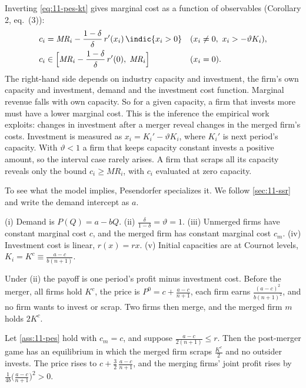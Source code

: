 Inverting \eqref{eq:11-pes-kt} gives marginal cost as a function of observables (Corollary 2, eq.~(3)):
\begin{equation}\label{eq:11-pes-cost}
\begin{aligned}
c_i &= \mathit{MR}_i - \frac{1 - \delta}{\delta}\, r'(x_i)\,\indic\{x_i > 0\} && (x_i \neq 0,\ x_i > -\vartheta K_i),\\
c_i &\in \Big[\mathit{MR}_i - \frac{1 - \delta}{\delta}\, r'(0),\; \mathit{MR}_i\Big] && (x_i = 0).
\end{aligned}
\end{equation}
The right-hand side depends on industry capacity and investment, the firm's own capacity and investment, demand and
the investment cost function. Marginal revenue falls with own capacity. So for a given capacity, a firm that invests
more must have a lower marginal cost. This is the inference the empirical work exploits: changes in investment after a
merger reveal changes in the merged firm's costs. Investment is measured as $x_i = K_i' - \vartheta K_i$, where $K_i'$
is next period's capacity. With $\vartheta < 1$ a firm that keeps capacity constant invests a positive amount, so the
interval case rarely arises. A firm that scraps all its capacity reveals only the bound $c_i \ge \mathit{MR}_i$, with
$c_i$ evaluated at zero capacity.

To see what the model implies, Pesendorfer specializes it. We follow \cref{sec:11-ssr} and write the demand intercept
as $a$.

\begin{assumption}\label{ass:11-pes}
(i) Demand is $P(Q) = a - bQ$. (ii) $\frac{\delta}{1 - \delta} = \vartheta = 1$. (iii) Unmerged firms have constant
marginal cost $c$, and the merged firm has constant marginal cost $c_m$. (iv) Investment cost is linear, $r(x) = rx$.
(v) Initial capacities are at Cournot levels, $K_i = K^c \equiv \frac{a - c}{b(n + 1)}$.
\end{assumption}

Under (ii) the payoff is one period's profit minus investment cost. Before the merger, all firms hold $K^c$, the price
is $P^0 = c + \frac{a - c}{n + 1}$, each firm earns $\frac{(a - c)^2}{b(n + 1)^2}$, and no firm wants to invest or scrap.
Two firms then merge, and the merged firm $m$ holds $2K^c$.

\begin{proposition}\label{prop:11-pes-profit}
Let \cref{ass:11-pes} hold with $c_m = c$, and suppose $\frac{a - c}{2(n + 1)} \le r$. Then the post-merger game has an
equilibrium in which the merged firm scraps $\frac{K^c}{2}$ and no outsider invests. The price rises to $c +
\frac{3}{2}\,\frac{a - c}{n + 1}$, and the merging firms' joint profit rises by $\frac{1}{4b}\big(\frac{a - c}{n +
1}\big)^2 > 0$.
\end{proposition}

